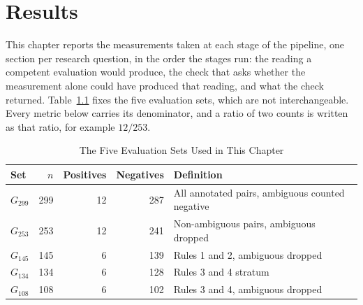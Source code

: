 %

\chapter{Results}
\label{ch:results}

This chapter reports the measurements taken at each stage of the pipeline, one
section per research question, in the order the stages run: the reading a
competent evaluation would produce, the check that asks whether the measurement alone could have produced that
reading, and what the check returned. Table~\ref{tab:denoms} fixes the five evaluation sets, which are not interchangeable. Every metric below carries its denominator,
and a ratio of two counts is written as that ratio, for example $12/253$.

\begin{table}[H]
\caption{The Five Evaluation Sets Used in This Chapter}
\centering
\small
\begin{tabular}{lrrrl}
\toprule
\textbf{Set} & \textbf{$n$} & \textbf{Positives} & \textbf{Negatives} &
\textbf{Definition} \\
\midrule
$G_{299}$ & 299 & 12 & 287 & All annotated pairs, ambiguous counted negative \\
$G_{253}$ & 253 & 12 & 241 & Non-ambiguous pairs, ambiguous dropped \\
$G_{145}$ & 145 & 6  & 139 & Rules 1 and 2, ambiguous dropped \\
$G_{134}$ & 134 & 6  & 128 & Rules 3 and 4 stratum \\
$G_{108}$ & 108 & 6  & 102 & Rules 3 and 4, ambiguous dropped \\
\bottomrule
\end{tabular}
\label{tab:denoms}
\end{table}

